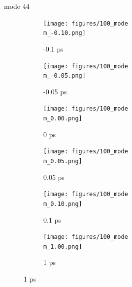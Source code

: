 \documentclass{beamer}
\newcommand\w{0.32}
\begin{document}
\renewcommand\m{44}
\begin{frame}{mode \m}
	\begin{figure}
		\centering
		\begin{subfigure}[b]{\w\textwidth}
			\centering
			\texttt{[image: figures/100\_mode\\m\_-0.10.png]}
			\caption{-0.1 ps}
		\end{subfigure}
		\begin{subfigure}[b]{\w\textwidth}
			\centering
			\texttt{[image: figures/100\_mode\\m\_-0.05.png]}
			\caption{-0.05 ps}
		\end{subfigure}
		\begin{subfigure}[b]{\w\textwidth}
			\centering
			\texttt{[image: figures/100\_mode\\m\_0.00.png]}
			\caption{0 ps}
		\end{subfigure}
		\begin{subfigure}[b]{\w\textwidth}
			\centering
			\texttt{[image: figures/100\_mode\\m\_0.05.png]}
			\caption{0.05 ps}
		\end{subfigure}
		\begin{subfigure}[b]{\w\textwidth}
			\centering
			\texttt{[image: figures/100\_mode\\m\_0.10.png]}
			\caption{0.1 ps}
		\end{subfigure}
		\begin{subfigure}[b]{\w\textwidth}
			\centering
			\texttt{[image: figures/100\_mode\\m\_1.00.png]}
			\caption{1 ps}
		\end{subfigure}
	\end{figure}
\end{frame}
\end{document}
